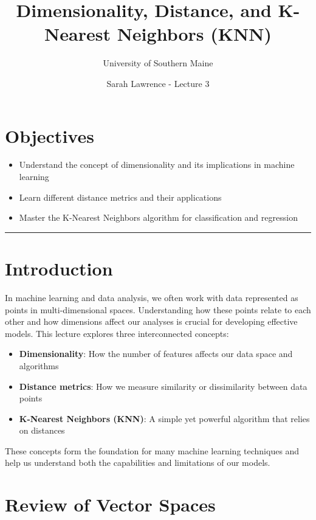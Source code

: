 \documentclass[12pt]{article}
\begin{document}
\title{Dimensionality, Distance, and K-Nearest Neighbors (KNN)}
\author{University of Southern Maine}
\date{Sarah Lawrence - Lecture 3}
\maketitle

\section*{Objectives}
\begin{itemize}
  \item Understand the concept of dimensionality and its implications in machine learning
  \item Learn different distance metrics and their applications
  \item Master the K-Nearest Neighbors algorithm for classification and regression
\end{itemize}

\rule[0.0051in]{\textwidth}{0.00025in}

\section{Introduction}
In machine learning and data analysis, we often work with data represented as points in multi-dimensional spaces. Understanding how these points relate to each other and how dimensions affect our analyses is crucial for developing effective models. This lecture explores three interconnected concepts:

\begin{itemize}
    \item \textbf{Dimensionality}: How the number of features affects our data space and algorithms
    \item \textbf{Distance metrics}: How we measure similarity or dissimilarity between data points
    \item \textbf{K-Nearest Neighbors (KNN)}: A simple yet powerful algorithm that relies on distances
\end{itemize}

These concepts form the foundation for many machine learning techniques and help us understand both the capabilities and limitations of our models.

\section{Review of Vector Spaces}
\end{document}
